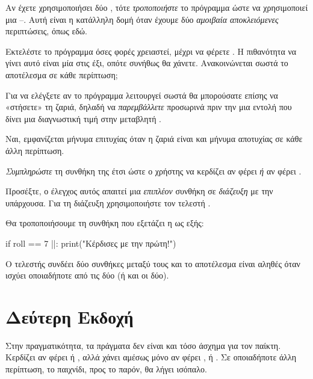 \documentclass[a4paper,11pt,oneside]{book}
\begin{document}
\begin{step}
Αν έχετε χρησιμοποιήσει δύο , τότε \emph{τροποποιήστε} το πρόγραμμα ώστε να χρησιμοποιεί μια --. Αυτή είναι η κατάλληλη δομή όταν έχουμε δύο \emph{αμοιβαία αποκλειόμενες} περιπτώσεις, όπως εδώ. 

Εκτελέστε το πρόγραμμα όσες φορές χρειαστεί, μέχρι να φέρετε . Η πιθανότητα να γίνει αυτό είναι μία στις έξι, οπότε συνήθως θα χάνετε. Ανακοινώνεται σωστά το αποτέλεσμα σε κάθε περίπτωση;

\begin{note}
Για να ελέγξετε αν το πρόγραμμα λειτουργεί σωστά θα μπορούσατε επίσης να «στήσετε» τη ζαριά, δηλαδή να \emph{παρεμβάλλετε} προσωρινά πριν την  μια εντολή που δίνει μια διαγνωστική τιμή στην μεταβλητή .
\end{note}

\begin{answer}
Ναι, εμφανίζεται μήνυμα επιτυχίας όταν η ζαριά είναι  και μήνυμα αποτυχίας σε κάθε άλλη περίπτωση.
\end{answer}
\end{step}

\begin{step}
\emph{Συμπληρώστε} τη συνθήκη της  έτσι ώστε ο χρήστης να κερδίζει αν φέρει  \emph{ή} αν φέρει .

\marginnote[16pt]{\iconcaution}
Προσέξτε, ο έλεγχος αυτός απαιτεί μια \emph{επιπλέον} συνθήκη σε \emph{διάζευξη} με την υπάρχουσα. Για τη διάζευξη χρησιμοποιήστε τον τελεστή .

\begin{answer}
Θα τροποποιήσουμε τη συνθήκη που εξετάζει η  ως εξής:

\begin{pyplain}
if roll == 7 ||:
    print("Κέρδισες με την πρώτη!")
\end{pyplain}

Ο τελεστής  συνδέει δύο συνθήκες μεταξύ τους και το αποτέλεσμα είναι αληθές όταν ισχύει οποιαδήποτε από τις δύο (ή και οι δύο).
\end{answer}
\end{step}

\section{Δεύτερη Εκδοχή}

Στην πραγματικότητα, τα πράγματα δεν είναι και τόσο άσχημα για τον παίκτη. Κερδίζει αν φέρει  ή , αλλά χάνει αμέσως μόνο αν φέρει ,  ή . Σε οποιαδήποτε άλλη περίπτωση, το παιχνίδι, προς το παρόν, θα λήγει ισόπαλο.
\end{document}
